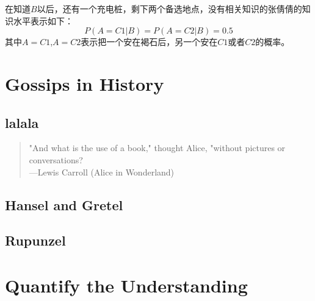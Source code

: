 \documentclass[oneside,11pt]{memoir} %
\begin{document}
在知道$B$以后，还有一个充电桩，剩下两个备选地点，没有相关知识的张倩倩的知识水平表示如下：
\begin{equation}
P(A=C1|B)=P(A=C2|B)=0.5
\end{equation}
其中$A=C1$,$A=C2$表示把一个安在褐石后，另一个安在$C1$或者$C2$的概率。



\part{Gossips in History}


\chapter{lalala}
\begin{quote}
"And what is the use of a book," thought Alice, "without pictures or conversations?\\
\hfill ---Lewis Carroll (Alice in Wonderland)
\end{quote}


\chapter{Hansel and Gretel}


\chapter{Rupunzel}


\part{Quantify the Understanding}
\end{document}
